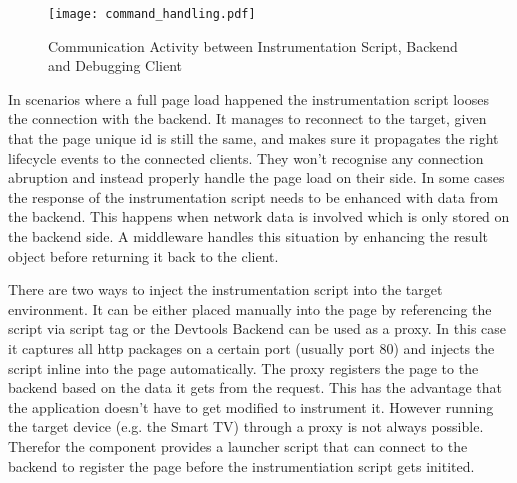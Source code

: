 \begin{figure}[htb]
  \centering
  \hspace*{-1.3cm}
  \texttt{[image: command\_handling.pdf]}\\
  \caption{Communication Activity between Instrumentation Script, Backend and Debugging Client}\label{fig:command_handling}
\end{figure}

In scenarios where a full page load happened the instrumentation script looses the connection with
the backend. It manages to reconnect to the target, given that the page unique id is still the same,
and makes sure it propagates the right lifecycle events to the connected clients. They won't recognise
any connection abruption and instead properly handle the page load on their side. In some cases the
response of the instrumentation script needs to be enhanced with data from the backend. This happens
when network data is involved which is only stored on the backend side. A middleware handles this
situation by enhancing the result object before returning it back to the client.

There are two ways to inject the instrumentation script into the target environment. It can be either
placed manually into the page by referencing the script via script tag or the Devtools Backend can be
used as a proxy. In this case it captures all http packages on a certain port (usually port 80) and
injects the script inline into the page automatically. The proxy registers the page to the backend
based on the data it gets from the request. This has the advantage that the application doesn't have
to get modified to instrument it. However running the target device (e.g. the Smart TV) through a
proxy is not always possible. Therefor the component provides a launcher script that can connect to
the backend to register the page before the instrumentiation script gets initited.

